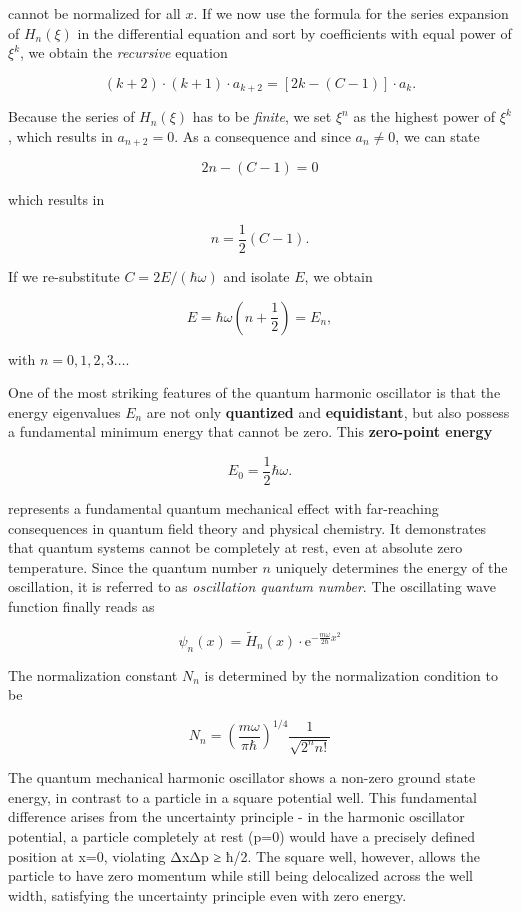 \documentclass[
  a4paper,
]{book}
\begin{document}
cannot be normalized for all \(x\). If we now use the formula for the
series expansion of \(H_n \left( \xi \right)\) in the differential
equation and sort by coefficients with equal power of \(\xi^k\), we
obtain the \emph{recursive} equation

\[
\left( k+2 \right) \cdot \left( k+1 \right) \cdot a_{k+2} = \left[ 2k - \left( C-1 \right)\right] \cdot a_k \mathrm{.}
\]

Because the series of \(H_n \left( \xi \right)\) has to be
\emph{finite}, we set \(\xi^n\) as the highest power of \(\xi^k\), which
results in \(a_{n+2} = 0\). As a consequence and since \(a_n \neq 0\),
we can state

\[
2n - \left( C-1 \right) = 0
\]

which results in

\[
n = \frac{1}{2} \left( C-1 \right) \mathrm{.}
\]

If we re-substitute \(C=2E / \left( \hbar \omega \right)\) and isolate
\(E\), we obtain

\[
E = \hbar \omega \left( n +\frac{1}{2} \right) = E_n\mathrm{,}
\]

with \(n = 0,1,2,3 \ldots\).

One of the most striking features of the quantum harmonic oscillator is
that the energy eigenvalues \(E_n\) are not only \textbf{quantized} and
\textbf{equidistant}, but also possess a fundamental minimum energy that
cannot be zero. This \textbf{zero-point energy}

\[
E_0 = \frac{1}{2} \hbar \omega \mathrm{.}
\]

represents a fundamental quantum mechanical effect with far-reaching
consequences in quantum field theory and physical chemistry. It
demonstrates that quantum systems cannot be completely at rest, even at
absolute zero temperature. Since the quantum number \(n\) uniquely
determines the energy of the oscillation, it is referred to as
\emph{oscillation quantum number}. The oscillating wave function finally
reads as

\[
\psi_n \left( x \right) = \tilde{H}_n \left( x \right) \cdot \mathrm{e}^{-\frac{m \omega}{2 \hbar} x^2}
\]

The normalization constant \(N_n\) is determined by the normalization
condition to be

\[N_n=\left(\frac{m \omega}{\pi \hbar}\right)^{1 / 4} \frac{1}{\sqrt{2^n n!}}\]

The quantum mechanical harmonic oscillator shows a non-zero ground state
energy, in contrast to a particle in a square potential well. This
fundamental difference arises from the uncertainty principle - in the
harmonic oscillator potential, a particle completely at rest (p=0) would
have a precisely defined position at x=0, violating ΔxΔp ≥ ħ/2. The
square well, however, allows the particle to have zero momentum while
still being delocalized across the well width, satisfying the
uncertainty principle even with zero energy.
\end{document}
